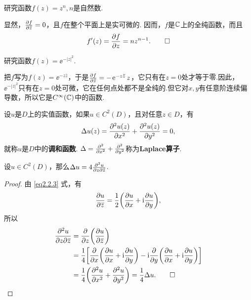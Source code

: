 \begin{example}
  研究函数$f(z)=z^n,n$是自然数.
\end{example}
\begin{solution}
  显然，$\pp f{\bar z}=0$，且$f$在整个平面上是实可微的. 因而，$f$是$\MC$上的全纯函数，而且
  \[
    f'(z) = \pp fz = nz^{n-1}. \qedhere
  \]
\end{solution}

\begin{example}
  研究函数$f(z)=\ee^{-|z|^2}$.
\end{example}
\begin{solution}
  把$f$写为$f(z)=\ee^{-z\bar z}$，于是$\pp f{\bar z}=-\ee^{-z\bar z}z$，它只有在$z=0$处才等于零.因此，$\ee^{-|z|^2}$只有在$z=0$处可微，它在任何点处都不是全纯的.但它对$x,y$有任意阶连续偏导数，所以它是$C^\infty(\MC)$中的函数.
\end{solution}

\begin{definition}\label{def2.2.7}
  设$u$是$D$上的实值函数，如果$u\in C^2(D)$，且对任意$z\in D$，有
  \[
    \Delta u(z) = \ppp{u(z)}{x} + \ppp{u(z)}{y} = 0,
  \]
  就称$u$是$D$中的\textbf{调和函数}. $\Delta =\ppp{}{x}+\ppp{}{y}$称为\textbf{Laplace算子}.
\end{definition}

\begin{prop}\label{prop2.2.8}
  设$u\in C^2(D)$，那么$\Delta u=4\pppp uz{\bar z}$.
\end{prop}
\begin{proof}
  由 \eqref{eq2.2.3} 式，有
  \[
    \pp u{\bar z} = \frac12\bigg( \pp ux + \ii\pp uy \bigg),
  \]
  所以
  \begin{align*}
    \pppp uz{\bar z} & = \pp {}z\bigg(\pp u{\bar z}\bigg)\\
    & = \frac14\bigg[\pp{}x\bigg(\pp ux+\ii \pp uy\bigg)-\ii\pp{}y\bigg(\pp ux+\ii\pp uy\bigg)\bigg]\\
    & = \frac14\bigg(\ppp ux+\ppp uy\bigg)=\frac14\Delta u. \qedhere
  \end{align*}
\end{proof}

